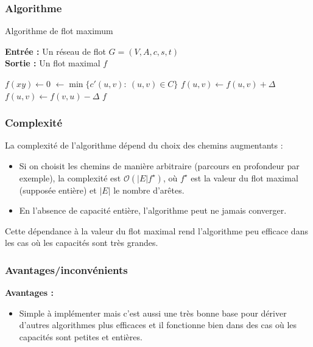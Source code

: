 \documentclass[a4paper]{article}
\begin{document}
\subsubsection{Algorithme}
\begin{algorithm}[H]
\caption{Algorithme de flot maximum}
\textbf{Entrée :} Un réseau de flot $G = (V, A, c, s, t)$ \\
\textbf{Sortie :} Un flot maximal $f$
\begin{algorithmic}[1]
    \State $f(xy) \gets 0$
\EndFor
{}
    \State \Delta $\gets \min \{c'(u, v):\: (u, v)\in C\}$ 
			\State $f(u, v) \gets f(u, v) + \Delta$
		\Else
			\State $f(u, v) \gets f(v, u) - \Delta$
		\EndIf
	\EndFor
\EndWhile
\State \Return $f$
\end{algorithmic}
\end{algorithm}
\subsubsection{Complexité}
La complexité de l’algorithme dépend du choix des chemins augmentants :
\begin{itemize}
    \item Si on choisit les chemins de manière arbitraire (parcours en profondeur par exemple), la complexité est $\mathcal{O}(|E|f^\star)$, où $f^\star$ est la valeur du flot maximal (supposée entière) et $|E|$ le nombre d’arêtes.
    \item En l’absence de capacité entière, l’algorithme peut ne jamais converger.
\end{itemize}
Cette dépendance à la valeur du flot maximal rend l’algorithme peu efficace dans les cas où les capacités sont très grandes.
\subsubsection{Avantages/inconvénients}
\textbf{Avantages :}
\begin{itemize}
    \item Simple à implémenter mais c'est aussi une très bonne base pour dériver d'autres algorithmes plus efficaces et il fonctionne bien dans des cas où les capacités sont petites et entières.
\end{itemize}
\end{document}
